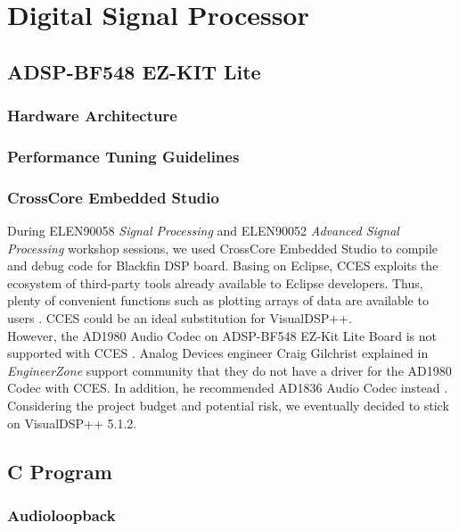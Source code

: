 \chapter{Digital Signal Processor}


\section{ADSP-BF548 EZ-KIT Lite}

\subsection{Hardware Architecture}

\subsection{Performance Tuning Guidelines}


\subsection{CrossCore Embedded Studio}

During ELEN90058 \textit{Signal Processing} and ELEN90052 \textit{Advanced Signal Processing} workshop sessions, we used CrossCore\textsuperscript{\textregistered} Embedded Studio to compile and debug code for Blackfin DSP board. Basing on Eclipse, CCES exploits the ecosystem of third-party tools already available to Eclipse developers. Thus, plenty of convenient functions such as plotting arrays of data are available to users \cite{erik-cces}\cite{cces-faq}. CCES could be an ideal substitution for VisualDSP++.\\

However, the AD1980 Audio Codec on ADSP-BF548 EZ-Kit Lite Board is not supported with CCES \cite{cces-ad1980}. Analog Devices engineer Craig Gilchrist explained in \textit{EngineerZone} support community that they do not have a driver for the AD1980 Codec with CCES. In addition, he recommended AD1836 Audio Codec instead \cite{BF548-BSP}.\\

Considering the project budget and potential risk, we eventually decided to stick on VisualDSP++ 5.1.2.


\section{C Program}

\subsection{Audioloopback}
